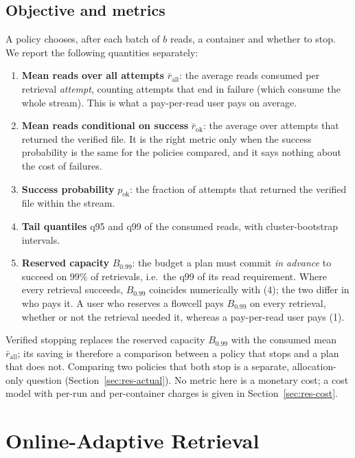 \documentclass[conference,onecolumn,11pt]{IEEEtran}
\begin{document}
\subsection{Objective and metrics}
A policy chooses, after each batch of $b$ reads, a container and whether to stop.  We report the
following quantities separately:
\begin{enumerate}
\item \textbf{Mean reads over all attempts} $\bar r_{\text{all}}$: the average reads consumed per
retrieval \emph{attempt}, counting attempts that end in failure (which consume the whole stream).
This is what a pay-per-read user pays on average.
\item \textbf{Mean reads conditional on success} $\bar r_{\text{ok}}$: the average over attempts that
returned the verified file.  It is the right metric only when the success probability is the same for
the policies compared, and it says nothing about the cost of failures.
\item \textbf{Success probability} $p_{\text{ok}}$: the fraction of attempts that returned the
verified file within the stream.
\item \textbf{Tail quantiles} q95 and q99 of the consumed reads, with cluster-bootstrap intervals.
\item \textbf{Reserved capacity} $B_{0.99}$: the budget a plan must commit \emph{in advance} to
succeed on 99\% of retrievals, i.e.\ the q99 of its read requirement.  Where every retrieval succeeds,
$B_{0.99}$ coincides numerically with (4); the two differ in who pays it.  A user who reserves a
flowcell pays $B_{0.99}$ on every retrieval, whether or not the retrieval needed it, whereas a
pay-per-read user pays (1).
\end{enumerate}
Verified stopping replaces the reserved capacity $B_{0.99}$ with the consumed mean $\bar r_{\text{all}}$;
its saving is therefore a comparison between a policy that stops and a plan that does not.  Comparing
two policies that both stop is a separate, allocation-only question (Section~\ref{sec:res-actual}).  No
metric here is a monetary cost; a cost model with per-run and per-container charges is given in
Section~\ref{sec:res-cost}.

\section{Online-Adaptive Retrieval}\label{sec:method}
\end{document}
